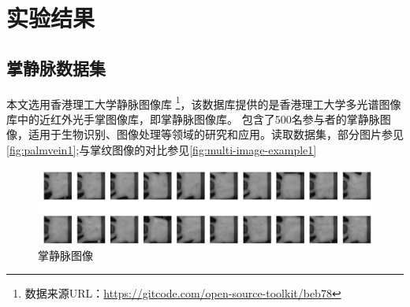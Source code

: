 \chapter{实验结果}
\section{掌静脉数据集}
本文选用香港理工大学静脉图像库
\footnote{数据来源URL：\url{https://gitcode.com/open-source-toolkit/beb78}}，该数据库提供的是香港理工大学多光谱图像库中的近红外光手掌图像库，即掌静脉图像库。
包含了500名参与者的掌静脉图像，适用于生物识别、图像处理等领域的研究和应用。读取数据集，部分图片参见\autoref{fig:palmvein1};与掌纹图像的对比参见\autoref{fig:multi-image-example1}
\begin{figure}[!htbp]
    \centering
    \includegraphics[scale = 0.6]{image/chap04/palmvein1.png}
    \caption{掌静脉图像}
    \label{fig:palmvein1}
\end{figure}

